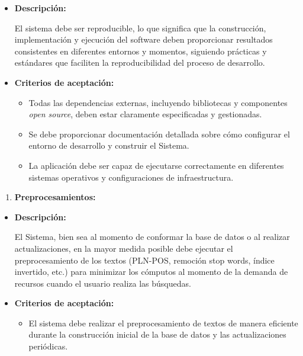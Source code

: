 \documentclass[
  12pt,
  openany]{book}
\providecommand{\tightlist}{%
  \setlength{\itemsep}{0pt}\setlength{\parskip}{0pt}}
\begin{document}
\begin{itemize}
\item
  \textbf{Descripción:}

  El sistema debe ser reproducible, lo que significa que la construcción, implementación y ejecución del software deben proporcionar resultados consistentes en diferentes entornos y momentos, siguiendo prácticas y estándares que faciliten la reproducibilidad del proceso de desarrollo.
\item
  \textbf{Criterios de aceptación:}

  \begin{itemize}
  \item
    Todas las dependencias externas, incluyendo bibliotecas y componentes \emph{open source}, deben estar claramente especificadas y gestionadas.
  \item
    Se debe proporcionar documentación detallada sobre cómo configurar el entorno de desarrollo y construir el Sistema.
  \item
    La aplicación debe ser capaz de ejecutarse correctamente en diferentes sistemas operativos y configuraciones de infraestructura.
  \end{itemize}
\end{itemize}

\begin{enumerate}
\def\labelenumi{\arabic{enumi}.}
\setcounter{enumi}{3}
\tightlist
\item
  \textbf{Preprocesamientos:}
\end{enumerate}

\begin{itemize}
\item
  \textbf{Descripción:}

  El Sistema, bien sea al momento de conformar la base de datos o al realizar actualizaciones, en la mayor medida posible debe ejecutar el preprocesamiento de los textos (PLN-POS, remoción stop words, índice invertido, etc.) para minimizar los cómputos al momento de la demanda de recursos cuando el usuario realiza las búsquedas.
\item
  \textbf{Criterios de aceptación:}

  \begin{itemize}
  \tightlist
  \item
    El sistema debe realizar el preprocesamiento de textos de manera eficiente durante la construcción inicial de la base de datos y las actualizaciones periódicas.
  \end{itemize}
\end{itemize}
\end{document}
